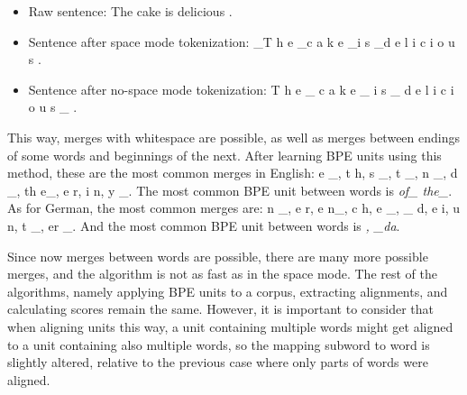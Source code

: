 \clearpage
\begin{itemize}
	\item Raw sentence: The cake is delicious .
	\item Sentence after space mode tokenization: \_T h e \_c a k e \_i s \_d e l i c i o u s .
	\item Sentence after no-space mode tokenization: T h e \_ c a k e \_ i s \_ d e l i c i o u s \_ .
\end{itemize}

This way, merges with whitespace are possible, as well as merges between endings of some words and beginnings of the next. After learning BPE units using this method, these are the most common merges in English: e \_, t h, s \_, t \_, n \_, d \_, th e\_, e r, i n, y \_. The most common BPE unit between words is \emph{of\_ the\_}. As for German, the most common merges are: n \_, e r, e n\_, c h, e \_, \_ d, e i, u n, t \_, er \_. And the most common BPE unit between words is \emph{, \_da}.

Since now merges between words are possible, there are many more possible merges, and the algorithm is not as fast as in the space mode. The rest of the algorithms, namely applying BPE units to a corpus, extracting alignments, and calculating scores remain the same. However, it is important to consider that when aligning units this way, a unit containing multiple words might get aligned to a unit containing also multiple words, so the mapping subword to word is slightly altered, relative to the previous case where only parts of words were aligned.
